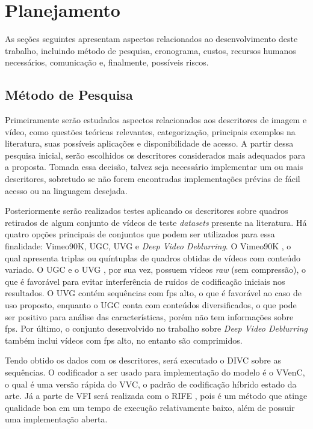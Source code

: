 \chapter{Planejamento}

As seções seguintes apresentam aspectos relacionados ao desenvolvimento deste trabalho, incluindo método de pesquisa, cronograma, custos, recursos humanos necessários, comunicação e, finalmente, possíveis riscos.

\section{Método de Pesquisa}

Primeiramente serão estudados aspectos relacionados aos descritores de imagem e vídeo, como questões teóricas relevantes, categorização, principais exemplos na literatura, suas possíveis aplicações e disponibilidade de acesso.
A partir dessa pesquisa inicial, serão escolhidos os descritores considerados mais adequados para a proposta.
Tomada essa decisão, talvez seja necessário implementar um ou mais descritores, sobretudo se não forem encontradas implementações prévias de fácil acesso ou na linguagem desejada.

Posteriormente serão realizados testes aplicando os descritores sobre quadros retirados de algum conjunto de vídeos de teste \textit{datasets} presente na literatura. 
Há quatro opções principais de conjuntos que podem ser utilizados para essa finalidade: Vimeo90K, \ac{UGC}, \ac{UVG} e  \textit{Deep Video Deblurring}. O Vimeo90K \cite{vimeo90k}, o qual apresenta triplas ou quíntuplas de quadros obtidas de vídeos com conteúdo variado. O \ac{UGC} \cite{Wang2019YouTubeUGC} e o \ac{UVG} \cite{mercat2020uvg}, por sua vez, possuem vídeos \textit{raw} (sem compressão), o que é favorável para evitar interferência de ruídos de codificação iniciais nos resultados. O \ac{UVG} contém sequências com \ac{fps} alto, o que é favorável ao caso de uso proposto, enquanto o UGC conta com conteúdos diversificados, o que pode ser positivo para análise das características, porém não tem informações sobre \ac{fps}.
Por último, o conjunto desenvolvido no trabalho sobre \textit{Deep Video Deblurring} também inclui vídeos com \ac{fps} alto, no entanto são comprimidos.

Tendo obtido os dados com os descritores, será executado o \ac{DIVC} sobre as sequências. 
O codificador a ser usado para implementação do modelo é o \ac{VVenC}, o qual é uma versão rápida do \ac{VVC}, o padrão de codificação híbrido estado da arte.
Já a parte de \ac{VFI} será realizada com o \ac{RIFE} \cite{rife}, pois é um método que atinge qualidade boa em um tempo de execução relativamente baixo, além de possuir uma implementação aberta.

